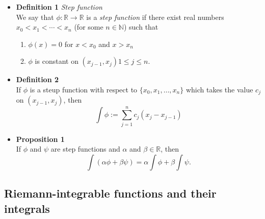 \documentclass[11pt,a4paper]{article}
\begin{document}
\begin{itemize}
    \item \textbf{Definition 1} \emph{Step function} \\
        We say that $\phi : \mathbb{R} \to \mathbb{R}$ is a \emph{step function} if there
        exist real numbers $x_0 < x_1 < \cdots < x_n$ (for some $n \in \mathbb{N}$) such that
        \begin{enumerate}
            \item $\phi(x) = 0$ for $x < x_0$ and $x > x_n$
            \item $\phi$ is constant on $(x_{j-1}, x_j) 1 \leq j \leq n$.
        \end{enumerate}

    \item \textbf{Definition 2} \\
        If $\phi$ is a steup function with respect to $\{x_0, x_1, \ldots, x_n\}$
        which takes the value $c_j$ on $(x_{j-1}, x_j)$, then
        \[
            \int \phi := \sum_{j=1}^n c_j (x_j - x_{j-1})
        \]

    \item \textbf{Proposition 1} \\
        If $\phi$ and $\psi$ are step functions and $\alpha$ and $\beta \in \mathbb{R}$, then
        \[
            \int(\alpha \phi + \beta \psi) = \alpha \int \phi + \beta \int \psi.
        \]

\end{itemize}

\subsection{Riemann-integrable functions and their integrals}
\end{document}
